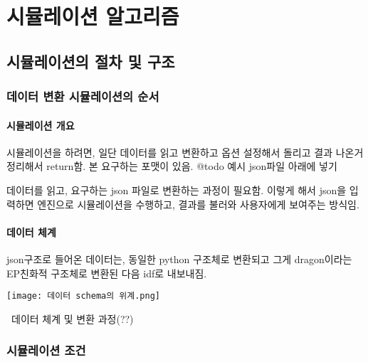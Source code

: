 \part{시뮬레이션 알고리즘}
\label{part:algorithm}


\chapter{시뮬레이션의 절차 및 구조}

\section{데이터 변환 시뮬레이션의 순서}

\subsection{시뮬레이션 개요}
시뮬레이션을 하려면, 일단 데이터를 읽고 변환하고 옵션 설정해서 돌리고 결과 나온거 정리해서 return함.
본 \simulator\는 요구하는 포맷이 있음. @todo 예시 json파일 아래에 넣기

데이터를 읽고, 요구하는 json 파일로 변환하는 과정이 필요함. 이렇게 해서 json을 입력하면 \simulator 엔진으로 시뮬레이션을 수행하고, 결과를 불러와 사용자에게 보여주는 방식임.

\subsection{데이터 체계}
json구조로 들어온 데이터는, 동일한 python 구조체로 변환되고 그게 dragon이라는 EP친화적 구조체로 변환된 다음 idf로 내보내짐. 

\begin{defaultfigure}
  \texttt{[image: 데이터 schema의 위계.png]}
  \caption{\simulator\ 데이터 체계 및 변환 과정(??)}
  \label{fig:data_hierarchy}
\end{defaultfigure}


\section{시뮬레이션 조건}
